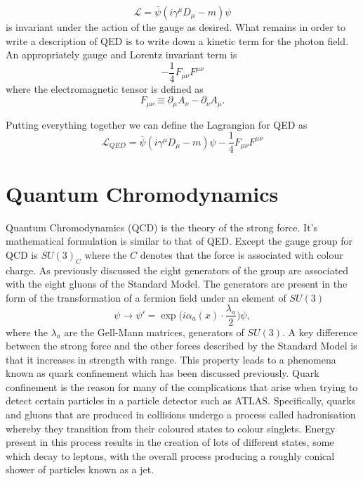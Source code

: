\begin{equation}
  \label{eq:dirac-cov} \mathcal{L} = \bar{\psi}(i\gamma^{\mu}D_{\mu} - m)\psi
\end{equation} is invariant under the action of the gauge as desired. What
remains in order to write a description of QED is to write down a kinetic term
for the photon field. An appropriately gauge and Lorentz invariant term is
\begin{equation}
  \label{eq:em-kinetic} -\frac{1}{4}F_{\mu\nu}F^{\mu\nu}
\end{equation} where the electromagnetic tensor is defined as
\begin{equation}
  \label{eq:em-tensor} F_{\mu\nu} \equiv \partial_{\mu}A_{\nu} -
\partial_{\nu}A_{\mu}.
\end{equation}

Putting everything together we can define the Lagrangian for QED as
\begin{equation}
  \label{eq:qed} \mathcal{L}_{QED} = \bar{\psi}(i\gamma^{\mu}D_{\mu} - m)\psi
-\frac{1}{4}F_{\mu\nu}F^{\mu\nu}
\end{equation}

\section{Quantum Chromodynamics}

Quantum Chromodynamics (QCD) is the theory of the strong force. It's
mathematical formulation is similar to that of QED. Except the gauge group for
QCD is $SU(3)_C$ where the $C$ denotes that the force is associated with colour
charge. As previously discussed the eight generators of the group are associated
with the eight gluons of the Standard Model. The generators are present in the
form of the transformation of a fermion field under an element of $SU(3)$
\begin{equation}
  \label{eq:su3-trans} \psi \rightarrow \psi' =
\exp\Big({i\alpha_{a}(x)\cdot\frac{\lambda_{a}}{2}}\Big)\psi,
\end{equation} where the $\lambda_a$ are the Gell-Mann matrices, generators of
$SU(3)$. A key difference between the strong force and the other forces
described by the Standard Model is that it increases in strength with range.
This property leads to a phenomena known as quark confinement which has been
discussed previously. Quark confinement is the reason for many of the
complications that arise when trying to detect certain particles in a particle
detector such as ATLAS. Specifically, quarks and gluons that are produced in
collisions undergo a process called hadronisation whereby they transition from
their coloured states to colour singlets. Energy present in this process results
in the creation of lots of different states, some which decay to leptons, with
the overall process producing a roughly conical shower of particles known as a
jet.

